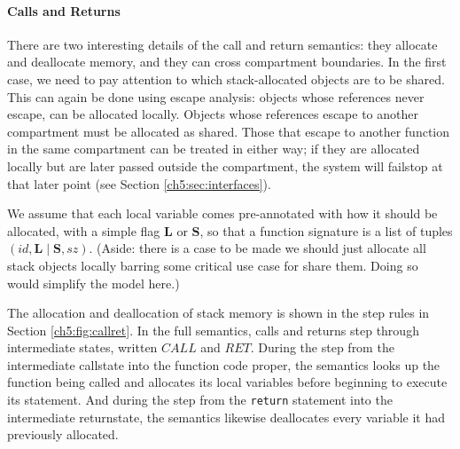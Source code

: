 \paragraph{Calls and Returns}

There are two interesting details of the call and return semantics:
they allocate and deallocate memory, and they can cross compartment boundaries.
In the first case, we need to pay attention to which stack-allocated
objects are to be shared. This can again be done using escape analysis:
objects whose references never escape, can be allocated locally. Objects whose
references escape to another compartment must be allocated as shared.
Those that escape to another function in the same compartment can be treated
in either way; if they are allocated locally but are later passed outside the
compartment, the system will failstop at that later point
(see Section \ref{ch5:sec:interfaces}).

We assume that each local variable comes pre-annotated with how it should
be allocated, with a simple flag \(\mathbf{L}\) or \(\mathbf{S}\), so that
a function signature is a list of tuples \((id,\mathbf{L} \mid \mathbf{S},sz)\).
(Aside: there is a case to be made we should just allocate all stack objects locally
barring some critical use case for share them. Doing so would simplify the model here.)

The allocation and deallocation of stack memory is shown in the step rules in
Section \ref{ch5:fig:callret}. In the full semantics, calls and returns step through
intermediate states, written \(\mathit{CALL}\) and \(\mathit{RET}\). During the
step from the intermediate callstate into the function code proper, the semantics
looks up the function being called and allocates its local variables before beginning
to execute its statement. And during the step from the {\tt return} statement into
the intermediate returnstate, the semantics likewise deallocates every variable it had
previously allocated.

